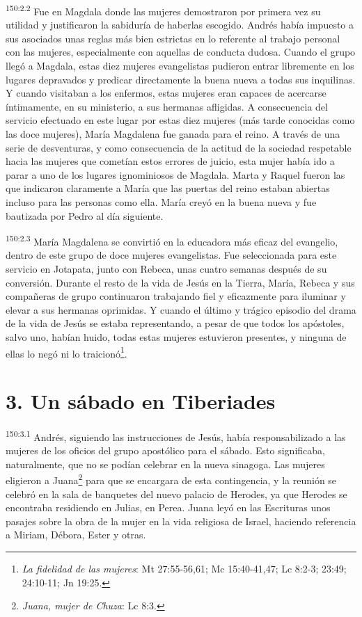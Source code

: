 \par 
\textsuperscript{150:2.2} Fue en Magdala donde las mujeres demostraron por primera vez su utilidad y justificaron la sabiduría de haberlas escogido. Andrés había impuesto a sus asociados unas reglas más bien estrictas en lo referente al trabajo personal con las mujeres, especialmente con aquellas de conducta dudosa. Cuando el grupo llegó a Magdala, estas diez mujeres evangelistas pudieron entrar libremente en los lugares depravados y predicar directamente la buena nueva a todas sus inquilinas. Y cuando visitaban a los enfermos, estas mujeres eran capaces de acercarse íntimamente, en su ministerio, a sus hermanas afligidas. A consecuencia del servicio efectuado en este lugar por estas diez mujeres (más tarde conocidas como las doce mujeres), María Magdalena fue ganada para el reino. A través de una serie de desventuras, y como consecuencia de la actitud de la sociedad respetable hacia las mujeres que cometían estos errores de juicio, esta mujer había ido a parar a uno de los lugares ignominiosos de Magdala. Marta y Raquel fueron las que indicaron claramente a María que las puertas del reino estaban abiertas incluso para las personas como ella. María creyó en la buena nueva y fue bautizada por Pedro al día siguiente.

\par 
\textsuperscript{150:2.3} María Magdalena se convirtió en la educadora más eficaz del evangelio, dentro de este grupo de doce mujeres evangelistas. Fue seleccionada para este servicio en Jotapata, junto con Rebeca, unas cuatro semanas después de su conversión. Durante el resto de la vida de Jesús en la Tierra, María, Rebeca y sus compañeras de grupo continuaron trabajando fiel y eficazmente para iluminar y elevar a sus hermanas oprimidas. Y cuando el último y trágico episodio del drama de la vida de Jesús se estaba representando, a pesar de que todos los apóstoles, salvo uno, habían huido, todas estas mujeres estuvieron presentes, y ninguna de ellas lo negó ni lo traicionó\footnote{\textit{La fidelidad de las mujeres}: Mt 27:55-56,61; Mc 15:40-41,47; Lc 8:2-3; 23:49; 24:10-11; Jn 19:25.}.

\section*{3. Un sábado en Tiberiades}
\par 
\textsuperscript{150:3.1} Andrés, siguiendo las instrucciones de Jesús, había responsabilizado a las mujeres de los oficios del grupo apostólico para el sábado. Esto significaba, naturalmente, que no se podían celebrar en la nueva sinagoga. Las mujeres eligieron a Juana\footnote{\textit{Juana, mujer de Chuza}: Lc 8:3.} para que se encargara de esta contingencia, y la reunión se celebró en la sala de banquetes del nuevo palacio de Herodes, ya que Herodes se encontraba residiendo en Julias, en Perea. Juana leyó en las Escrituras unos pasajes sobre la obra de la mujer en la vida religiosa de Israel, haciendo referencia a Miriam, Débora, Ester y otras.

